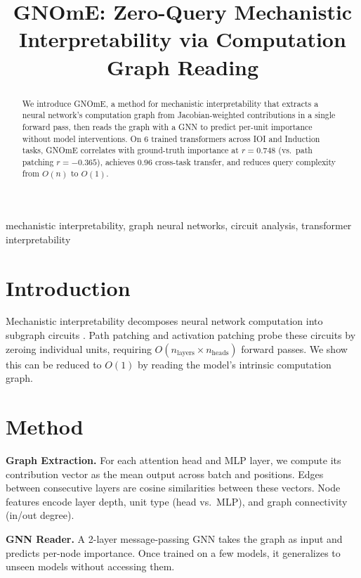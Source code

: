 \documentclass[conference]{IEEEtran}
\title{GNOmE: Zero-Query Mechanistic Interpretability via Computation Graph Reading}
\author{
\IEEEauthorblockN{Sehaj Singh}
\IEEEauthorblockA{Independent Research\\
sehajr-singhs@gmail.com}
}
\begin{document}
\maketitle

\begin{abstract}
We introduce GNOmE, a method for mechanistic interpretability that extracts a neural network's computation graph from Jacobian-weighted contributions in a single forward pass, then reads the graph with a GNN to predict per-unit importance without model interventions. On 6 trained transformers across IOI and Induction tasks, GNOmE correlates with ground-truth importance at $r = 0.748$ (vs.\ path patching $r = -0.365$), achieves 0.96 cross-task transfer, and reduces query complexity from $O(n)$ to $O(1)$.
\end{abstract}

\begin{IEEEkeywords}
mechanistic interpretability, graph neural networks, circuit analysis, transformer interpretability
\end{IEEEkeywords}

\section{Introduction}

Mechanistic interpretability decomposes neural network computation into subgraph circuits \citep{olah2020zoom, elhage2021mathematical}. Path patching \citep{wang2023interpretability} and activation patching \citep{geiger2021causal} probe these circuits by zeroing individual units, requiring $O(n_\text{layers} \times n_\text{heads})$ forward passes. We show this can be reduced to $O(1)$ by reading the model's intrinsic computation graph.

\section{Method}

\textbf{Graph Extraction.} For each attention head and MLP layer, we compute its contribution vector as the mean output across batch and positions. Edges between consecutive layers are cosine similarities between these vectors. Node features encode layer depth, unit type (head vs.\ MLP), and graph connectivity (in/out degree).

\textbf{GNN Reader.} A 2-layer message-passing GNN takes the graph as input and predicts per-node importance. Once trained on a few models, it generalizes to unseen models without accessing them.
\end{document}
